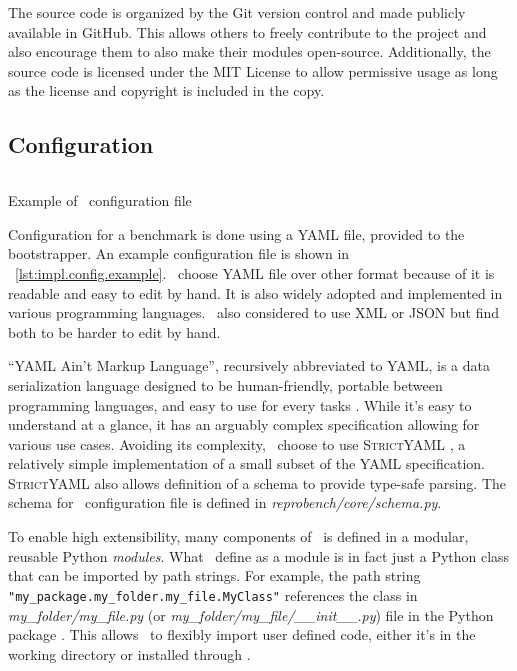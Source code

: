 The source code is organized by the Git version control and made publicly available in GitHub.
This allows others to freely contribute to the project and also encourage them to also make their modules open-source.
Additionally, the source code is licensed under the MIT License to allow permissive usage as long as the license and copyright is included in the copy.

\subsection{Configuration}

\begin{listing}
    \inputminted{yaml}{assets/listings/pseudocodes/config.yml}
    \caption{Example of \OurBenchmarkingTool~configuration file}
    \label{lst:impl.config.example}
\end{listing}

Configuration for a benchmark is done using a YAML file, provided to the bootstrapper.
An example configuration file is shown in \lst~\ref{lst:impl.config.example}.
\First~choose YAML file over other format because of it is readable and easy to edit by hand.
It is also widely adopted and implemented in various programming languages.
\First~also considered to use XML or JSON but find both to be harder to edit by hand.

``YAML Ain’t Markup Language'', recursively abbreviated to YAML, is a data serialization language designed to be human-friendly, portable between programming languages, and easy to use for every tasks \citep{ben2005yaml}.
While it's easy to understand at a glance, it has an arguably complex specification allowing for various use cases.
Avoiding its complexity, \first~choose to use \textsc{StrictYAML} \citep{oconnorTypesafeYAMLParser2019}, a relatively simple implementation of a small subset of the YAML specification.
\textsc{StrictYAML} also allows definition of a schema to provide type-safe parsing.
The schema for \OurBenchmarkingTool~configuration file is defined in \emph{reprobench/core/schema.py}.

To enable high extensibility, many components of \OurBenchmarkingTool~is defined in a modular, reusable Python \emph{modules}.
What \first~define as a module is in fact just a Python class that can be imported by path strings.
For example, the path string \texttt{"my_package.my_folder.my_file.MyClass"} references the class  in \emph{my\_folder/my\_file.py} (or \emph{my\_folder/my\_file/\_\_init\_\_.py}) file in the Python package .
This allows \OurBenchmarkingTool~to flexibly import user defined code, either it's in the working directory or installed through .

